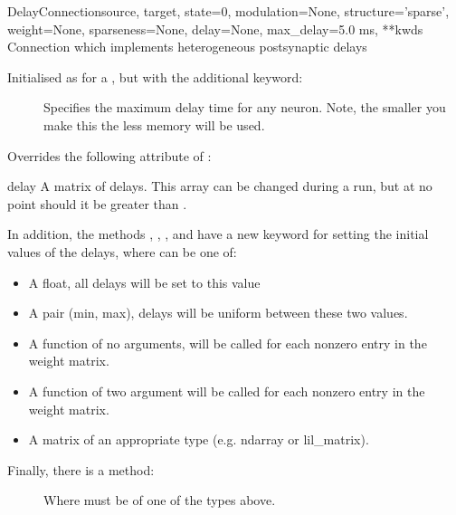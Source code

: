 \documentclass[letterpaper,10pt,english]{manual}
\begin{document}
\hypertarget{brian.DelayConnection}{}\begin{classdesc}{DelayConnection}{source, target, state=0, modulation=None, structure='sparse', weight=None, sparseness=None, delay=None, max\_delay=5.0 ms, **kwds}
Connection which implements heterogeneous postsynaptic delays

Initialised as for a \hyperlink{brian.Connection}{}, but with the additional
keyword:
\begin{description}
\item[]
Specifies the maximum delay time for any
neuron. Note, the smaller you make this the less memory will be
used.

\end{description}

Overrides the following attribute of \hyperlink{brian.Connection}{}:

\hypertarget{brian.DelayConnection.delay}{}\begin{memberdesc}{delay}
A matrix of delays. This array can be changed during a run,
but at no point should it be greater than .
\end{memberdesc}

In addition, the methods , , ,
and  have a new keyword  for setting the
initial values of the delays, where  can be one of:
\begin{itemize}
\item {} 
A float, all delays will be set to this value

\item {} 
A pair (min, max), delays will be uniform between these two
values.

\item {} 
A function of no arguments, will be called for each nonzero
entry in the weight matrix.

\item {} 
A function of two argument  will be called for each
nonzero entry in the weight matrix.

\item {} 
A matrix of an appropriate type (e.g. ndarray or lil\_matrix).

\end{itemize}

Finally, there is a method:
\begin{description}
\item[]
Where  must be of one of the types above.


\end{description}
\end{classdesc}
\end{document}
